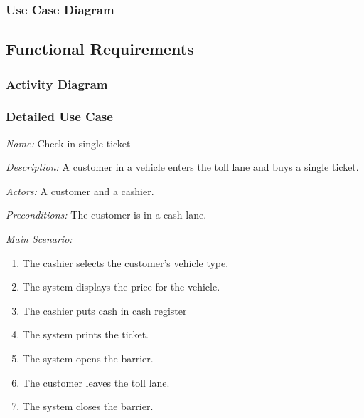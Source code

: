 \subsubsection {Use Case Diagram}

\subsection{Functional Requirements}

\subsubsection{Activity Diagram}

\subsubsection{Detailed Use Case}



\textit {Name: } Check in single ticket

\textit {Description: } A customer in a vehicle enters the toll lane and buys a single ticket.

\textit {Actors: } A customer and a cashier.

\textit {Preconditions: }  The customer is in a cash lane.

\textit{Main Scenario: }

\begin{enumerate}
	\item The cashier selects the customer's vehicle type.
	\item The system displays the price for the vehicle.
	\item The cashier puts cash in cash register
	\item The system prints the ticket.
	\item The system opens the barrier.
	\item The customer leaves the toll lane.
	\item The system closes the barrier.
\end{enumerate}

